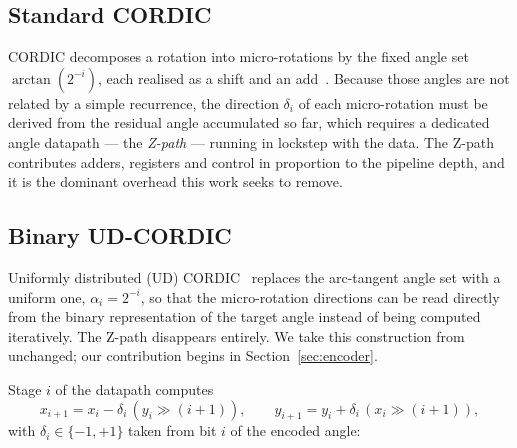 %
%

\subsection{Standard CORDIC}
\label{sec:stdcordic}

CORDIC decomposes a rotation into micro-rotations by the fixed angle set
$\arctan(2^{-i})$, each realised as a shift and an add~\cite{volder}. Because
those angles are not related by a simple recurrence, the direction $\delta_i$
of each micro-rotation must be derived from the residual angle accumulated so
far, which requires a dedicated angle datapath --- the \emph{Z-path} --- running
in lockstep with the data. The Z-path contributes adders, registers and control
in proportion to the pipeline depth, and it is the dominant overhead this work
seeks to remove.

\subsection{Binary UD-CORDIC}
\label{sec:binaryud}

Uniformly distributed (UD) CORDIC~\cite{garrido2025ud} replaces the arc-tangent
angle set with a uniform one, $\alpha_i = 2^{-i}$, so that the micro-rotation
directions can be read directly from the binary representation of the target
angle instead of being computed iteratively. The Z-path disappears entirely.
We take this construction from~\cite{garrido2025ud} unchanged; our contribution
begins in Section~\ref{sec:encoder}.

Stage $i$ of the datapath computes
\begin{equation}
  x_{i+1} = x_i - \delta_i\,(y_i \gg (i{+}1)), \qquad
  y_{i+1} = y_i + \delta_i\,(x_i \gg (i{+}1)),
  \label{eq:binstage}
\end{equation}
with $\delta_i \in \{-1, +1\}$ taken from bit $i$ of the encoded angle:

